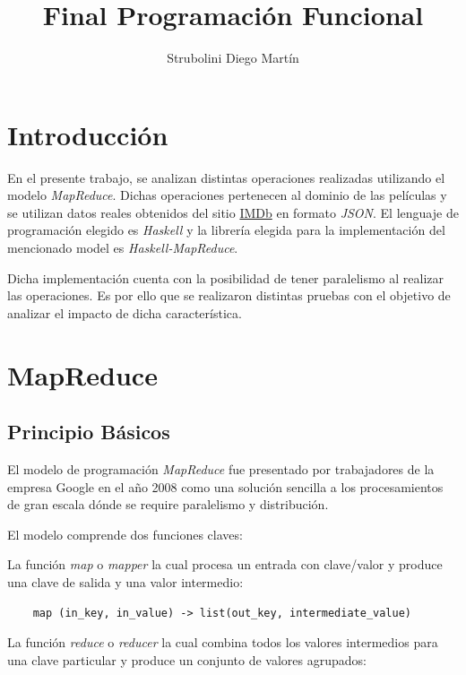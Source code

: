 \documentclass[a4paper,11pt]{article}
\begin{document}
\title{Final Programación Funcional}
\author{Strubolini Diego Martín}

\maketitle

\section{Introducción}

En el presente trabajo, se analizan distintas operaciones realizadas utilizando el modelo \textit{MapReduce}. Dichas operaciones pertenecen al dominio de las películas y se utilizan datos reales obtenidos del sitio \href{http://IMDb.com}{IMDb} en formato \textit{JSON}. El lenguaje de programación elegido es \textit{Haskell} y la librería elegida para la implementación del mencionado model es \textit{Haskell-MapReduce}.

Dicha implementación cuenta con la posibilidad de tener paralelismo al realizar las operaciones. Es por ello que se realizaron distintas pruebas con el objetivo de analizar el impacto de dicha característica.

\section{MapReduce}

\subsection{Principio Básicos}

El modelo de programación \textit{MapReduce} fue presentado por trabajadores de la empresa Google en el año 2008 \cite{dean2008mapreduce} como una solución sencilla a los procesamientos de gran escala dónde se require paralelismo y distribución.

El modelo comprende dos funciones claves:

La función \textit{map} o \textit{mapper} la cual procesa un entrada con clave/valor y produce una clave de salida y una valor intermedio:

\begin{lstlisting}
	map (in_key, in_value) -> list(out_key, intermediate_value)
\end{lstlisting}

La función \textit{reduce} o \textit{reducer} la cual combina todos los valores intermedios para una clave particular y produce un conjunto de valores agrupados:
\end{document}
